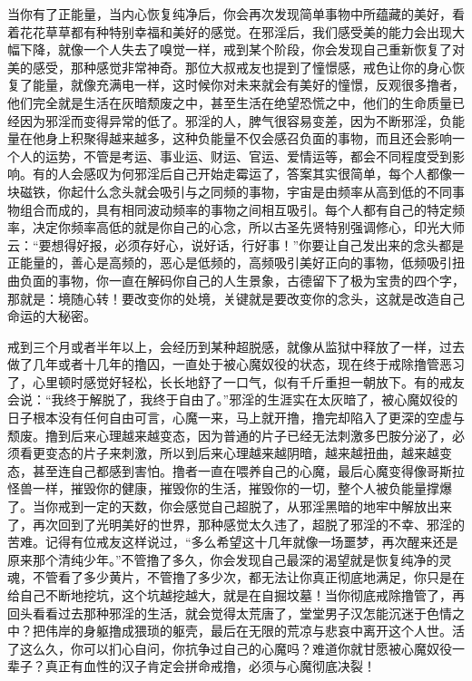 当你有了正能量，当内心恢复纯净后，你会再次发现简单事物中所蕴藏的美好，看着花花草草都有种特别幸福和美好的感觉。在邪淫后，我们感受美的能力会出现大幅下降，就像一个人失去了嗅觉一样，戒到某个阶段，你会发现自己重新恢复了对美的感受，那种感觉非常神奇。那位大叔戒友也提到了憧憬感，戒色让你的身心恢复了能量，就像充满电一样，这时候你对未来就会有美好的憧憬，反观很多撸者，他们完全就是生活在灰暗颓废之中，甚至生活在绝望恐慌之中，他们的生命质量已经因为邪淫而变得异常的低了。邪淫的人，脾气很容易变差，因为不断邪淫，负能量在他身上积聚得越来越多，这种负能量不仅会感召负面的事物，而且还会影响一个人的运势，不管是考运、事业运、财运、官运、爱情运等，都会不同程度受到影响。有的人会感叹为何邪淫后自己开始走霉运了，答案其实很简单，每个人都像一块磁铁，你起什么念头就会吸引与之同频的事物，宇宙是由频率从高到低的不同事物组合而成的，具有相同波动频率的事物之间相互吸引。每个人都有自己的特定频率，决定你频率高低的就是你自己的心念，所以古圣先贤特别强调修心，印光大师云：“要想得好报，必须存好心，说好话，行好事！”你要让自己发出来的念头都是正能量的，善心是高频的，恶心是低频的，高频吸引美好正向的事物，低频吸引扭曲负面的事物，你一直在解码你自己的人生景象，古德留下了极为宝贵的四个字，那就是：境随心转！要改变你的处境，关键就是要改变你的念头，这就是改造自己命运的大秘密。

戒到三个月或者半年以上，会经历到某种超脱感，就像从监狱中释放了一样，过去做了几年或者十几年的撸囚，一直处于被心魔奴役的状态，现在终于戒除撸管恶习了，心里顿时感觉好轻松，长长地舒了一口气，似有千斤重担一朝放下。有的戒友会说：“我终于解脱了，我终于自由了。”邪淫的生涯实在太灰暗了，被心魔奴役的日子根本没有任何自由可言，心魔一来，马上就开撸，撸完却陷入了更深的空虚与颓废。撸到后来心理越来越变态，因为普通的片子已经无法刺激多巴胺分泌了，必须看更变态的片子来刺激，所以到后来心理越来越阴暗，越来越扭曲，越来越变态，甚至连自己都感到害怕。撸者一直在喂养自己的心魔，最后心魔变得像哥斯拉怪兽一样，摧毁你的健康，摧毁你的生活，摧毁你的一切，整个人被负能量撑爆了。当你戒到一定的天数，你会感觉自己超脱了，从邪淫黑暗的地牢中解放出来了，再次回到了光明美好的世界，那种感觉太久违了，超脱了邪淫的不幸、邪淫的苦难。记得有位戒友这样说过，“多么希望这十几年就像一场噩梦，再次醒来还是原来那个清纯少年。”不管撸了多久，你会发现自己最深的渴望就是恢复纯净的灵魂，不管看了多少黄片，不管撸了多少次，都无法让你真正彻底地满足，你只是在给自己不断地挖坑，这个坑越挖越大，就是在自掘坟墓！当你彻底戒除撸管了，再回头看看过去那种邪淫的生活，就会觉得太荒唐了，堂堂男子汉怎能沉迷于色情之中？把伟岸的身躯撸成猥琐的躯壳，最后在无限的荒凉与悲哀中离开这个人世。活了这么久，你可以扪心自问，你抗争过自己的心魔吗？难道你就甘愿被心魔奴役一辈子？真正有血性的汉子肯定会拼命戒撸，必须与心魔彻底决裂！

